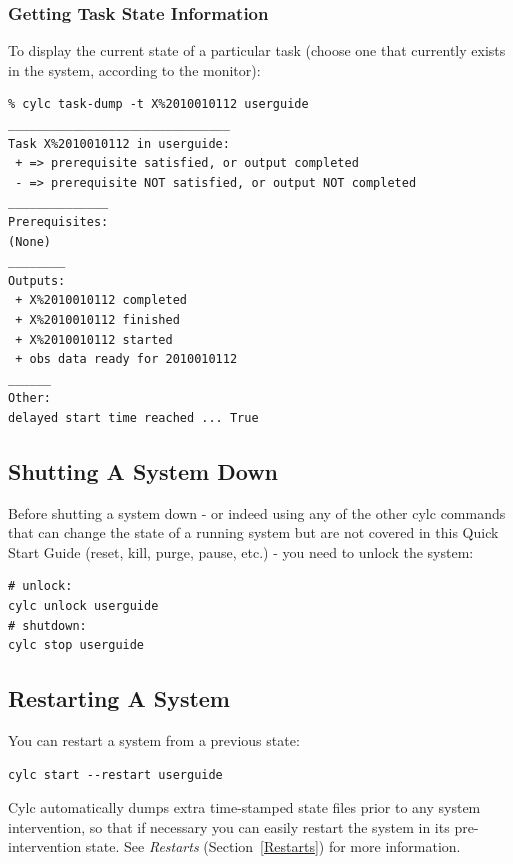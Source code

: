 \documentclass[11pt,a4paper]{article}
\begin{document}
\subsubsection{Getting Task State Information}
\label{QuickGettingTaskStateInformation}

To display the current state of a particular task (choose one that
currently exists in the system, according to the monitor):

\begin{lstlisting}
% cylc task-dump -t X%2010010112 userguide
_______________________________
Task X%2010010112 in userguide:
 + => prerequisite satisfied, or output completed
 - => prerequisite NOT satisfied, or output NOT completed
______________
Prerequisites:
(None)
________
Outputs:
 + X%2010010112 completed
 + X%2010010112 finished
 + X%2010010112 started
 + obs data ready for 2010010112
______
Other:
delayed start time reached ... True
\end{lstlisting}

\subsection{Shutting A System Down}
\label{QuickShuttingASystemDown}

\lstset{language=bash}

Before shutting a system down - or indeed using any of the other cylc
commands that can change the state of a running system but are not 
covered in this Quick Start Guide (reset, kill, purge, pause, etc.) -
you need to unlock the system:

\begin{lstlisting}
# unlock:
cylc unlock userguide
# shutdown:
cylc stop userguide
\end{lstlisting}

\subsection{Restarting A System}
\label{QuickRestartingASystem}

You can restart a system from a previous state:

\begin{lstlisting}
cylc start --restart userguide
\end{lstlisting}

Cylc automatically dumps extra time-stamped state files prior to any
system intervention, so that if necessary you can easily restart the
system in its pre-intervention state.  See {\em Restarts}
(Section~\ref{Restarts}) for more information.
\end{document}
